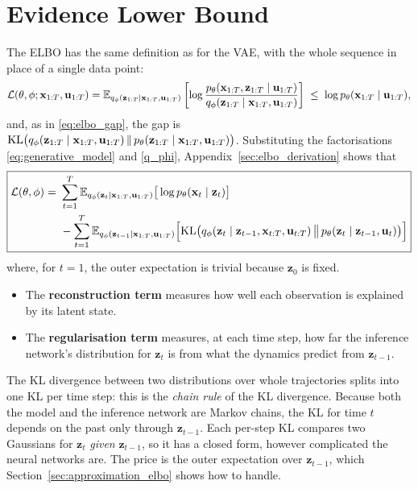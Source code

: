 \section{Evidence Lower Bound}\label{sec:elbo}

The ELBO has the same definition as for the VAE, with the whole sequence
in place of a single data point:
\begin{align*}
    \mathcal{L}(\theta, \phi; \mathbf{x}_{1:T}, \mathbf{u}_{1:T}) =
    \mathbb{E}_{q_\phi(\mathbf{z}_{1:T} \mid \mathbf{x}_{1:T}, \mathbf{u}_{1:T})}
    \left[ \log \frac{p_\theta(\mathbf{x}_{1:T}, \mathbf{z}_{1:T} \mid
    \mathbf{u}_{1:T})}{q_\phi(\mathbf{z}_{1:T} \mid \mathbf{x}_{1:T},
    \mathbf{u}_{1:T})} \right]
    \;\leq\; \log p_\theta(\mathbf{x}_{1:T} \mid \mathbf{u}_{1:T}),
\end{align*}
and, as in \eqref{eq:elbo_gap}, the gap is
$\mathrm{KL}\big(q_\phi(\mathbf{z}_{1:T} \mid \mathbf{x}_{1:T}, \mathbf{u}_{1:T})
\,\|\, p_\theta(\mathbf{z}_{1:T} \mid \mathbf{x}_{1:T},
\mathbf{u}_{1:T})\big)$. Substituting the factorisations
\eqref{eq:generative_model} and \eqref{q_phi}, Appendix~\ref{sec:elbo_derivation}
shows that
\begin{equation}
\boxed{
\begin{aligned}
    \mathcal{L}(\theta, \phi) =\ &
    \sum_{t=1}^T \mathbb{E}_{q_{\phi}(\mathbf{z}_{t} \mid \mathbf{x}_{1:T},
    \mathbf{u}_{1:T})} \big[\log p_\theta(\mathbf{x}_t \mid
    \mathbf{z}_{t})\big] \\
    & - \sum_{t=1}^T \mathbb{E}_{q_\phi(\mathbf{z}_{t-1} \mid \mathbf{x}_{1:T},
    \mathbf{u}_{1:T})} \Big[ \mathrm{KL}\big( q_\phi(\mathbf{z}_t \mid
    \mathbf{z}_{t-1}, \mathbf{x}_{t:T}, \mathbf{u}_{t:T}) \,\big\|\,
    p_\theta(\mathbf{z}_t \mid \mathbf{z}_{t-1}, \mathbf{u}_{t}) \big)
    \Big]
\end{aligned}
}
\label{eq:dkf_elbo}
\end{equation}
where, for $t = 1$, the outer expectation is trivial because
$\mathbf{z}_0$ is fixed.
\begin{itemize}
    \item The \textbf{reconstruction term} measures how well each
    observation is explained by its latent state.
    \item The \textbf{regularisation term} measures, at each time step,
    how far the inference network's distribution for $\mathbf{z}_t$ is
    from what the dynamics predict from $\mathbf{z}_{t-1}$.
\end{itemize}

\begin{inwords}
The KL divergence between two distributions over whole trajectories
splits into one KL per time step: this is the \emph{chain rule} of the
KL divergence. Because both the model and the inference network are
Markov chains, the KL for time $t$ depends on the past only through
$\mathbf{z}_{t-1}$. Each per-step KL compares two Gaussians for
$\mathbf{z}_t$ \emph{given} $\mathbf{z}_{t-1}$, so it has a closed form,
however complicated the neural networks are. The price is the outer
expectation over $\mathbf{z}_{t-1}$, which Section~\ref{sec:approximation_elbo}
shows how to handle.
\end{inwords}

